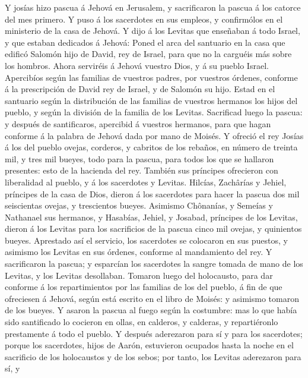  Y josías hizo pascua á Jehová en Jerusalem, y sacrificaron
la pascua á los catorce del mes primero.  Y puso á los
sacerdotes en sus empleos, y confirmólos en el ministerio de la casa de
Jehová.  Y dijo á los Levitas que enseñaban á todo Israel, y
que estaban dedicados á Jehová: Poned el arca del santuario en la casa
que edificó Salomón hijo de David, rey de Israel, para que no la
carguéis más sobre los hombros. Ahora serviréis á Jehová vuestro Dios, y
á su pueblo Israel.  Apercibíos según las familias de
vuestros padres, por vuestros órdenes, conforme á la prescripción de
David rey de Israel, y de Salomón su hijo.  Estad en el
santuario según la distribución de las familias de vuestros hermanos los
hijos del pueblo, y según la división de la familia de los Levitas.
 Sacrificad luego la pascua: y después de santificaros,
apercibid á vuestros hermanos, para que hagan conforme á la palabra de
Jehová dada por mano de Moisés.  Y ofreció el rey Josías á
los del pueblo ovejas, corderos, y cabritos de los rebaños, en número de
treinta mil, y tres mil bueyes, todo para la pascua, para todos los que
se hallaron presentes: esto de la hacienda del rey.  También
sus príncipes ofrecieron con liberalidad al pueblo, y á los sacerdotes y
Levitas. Hilcías, Zachârías y Jehiel, príncipes de la casa de Dios,
dieron á los sacerdotes para hacer la pascua dos mil seiscientas ovejas,
y trescientos bueyes.  Asimismo Chônanías, y Semeías y
Nathanael sus hermanos, y Hasabías, Jehiel, y Josabad, príncipes de los
Levitas, dieron á los Levitas para los sacrificios de la pascua cinco
mil ovejas, y quinientos bueyes.  Aprestado así el
servicio, los sacerdotes se colocaron en sus puestos, y asimismo los
Levitas en sus órdenes, conforme al mandamiento del rey.  Y
sacrificaron la pascua; y esparcían los sacerdotes la sangre tomada de
mano de los Levitas, y los Levitas desollaban.  Tomaron
luego del holocausto, para dar conforme á los repartimientos por las
familias de los del pueblo, á fin de que ofreciesen á Jehová, según está
escrito en el libro de Moisés: y asimismo tomaron de los bueyes.
 Y asaron la pascua al fuego según la costumbre: mas lo que
había sido santificado lo cocieron en ollas, en calderos, y calderas, y
repartiéronlo prestamente á todo el pueblo.  Y después
aderezaron para sí y para los sacerdotes; porque los sacerdotes, hijos
de Aarón, estuvieron ocupados hasta la noche en el sacrificio de los
holocaustos y de los sebos; por tanto, los Levitas aderezaron para sí, y

